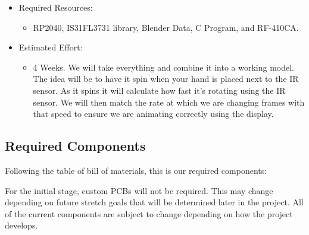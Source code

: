 \documentclass[11pt,journal]{IEEEtran}
\begin{document}
\begin{enumerate}
\begin{itemize}
        \item Required Resources:
        \begin{itemize}
            \item RP2040, IS31FL3731 library, Blender Data, C Program, and RF-410CA.
        \end{itemize}
        \item Estimated Effort:
        \begin{itemize}
            \item 4 Weeks. We will take everything and combine it into a working model. The idea will be to have it spin when your hand is placed next to the IR sensor. As it spins it will calculate how fast it’s rotating using the IR sensor. We will then match the rate at which we are changing frames with that speed to ensure we are animating correctly using the display.
        \end{itemize}
    \end{itemize}
\end{enumerate}



\subsection{Required Components}

Following the table of bill of materials, this is our required components:

For the initial stage, custom PCBs will not be required. This may change depending on future stretch goals that will be determined later in the project. All of the current components are subject to change depending on how the project develops.
\end{document}
